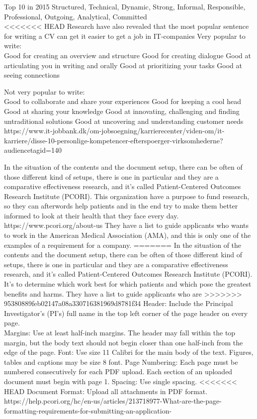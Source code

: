 Top 10 in 2015
Structured,
Technical,
Dynamic,
Strong,
Informal,
Responsible,
Professional,
Outgoing,
Analytical,
Committed \\

<<<<<<< HEAD
Research have also revealed that the most popular sentence for writing a CV can get it easier to get a job in IT-companies
Very popular to write:\\
Good for creating an overview and structure
Good for creating dialogue
Good at articulating you in writing and orally
Good at prioritizing your tasks
Good at seeing connections

Not very popular to write: \\
Good to collaborate and share your experiences
Good for keeping a cool head
Good at sharing your knowledge
Good at innovating, challenging and finding untraditional solutions
Good at uncovering and understanding customer needs
https://www.it-jobbank.dk/om-jobsoegning/karrierecenter/viden-om/it-karriere/disse-10-personlige-kompetencer-efterspoerger-virksomhederne?audiencetagid=140

In the situation of the contents and the document setup, there can be often of those different kind of setups, 
there is one in particular and they are a comparative effectiveness research, and it's called 
Patient-Centered Outcomes Research Institute (PCORI). 
This organization have a purpose to fund research, so they can afterwords help patients and in the end try to make them better
informed to look at their health that they face every day.
https://www.pcori.org/about-us
They have a list to guide applicants who wants to work in the American Medical Association (AMA),
and this is only one of the examples of a requirement for a company.
=======
In the situation of the contents and the document setup, there can be often of those different kind of setups,
there is one in particular and they are a comparative effectiveness research, and it's called
Patient-Centered Outcomes Research Institute (PCORI).
It's to determine which work best for which patients and which pose the greatest benefits and harms. %
They have a list to guide applicants who are
>>>>>>> 95380889feb02147a08a330716381969d8781f34
Header: Include the Principal Investigator’s (PI’s) full name in the top left corner of the page header on every page. \\
Margins: Use at least half-inch margins. The header may fall within the top margin, but the body text should not begin closer than one half-inch from the edge of the page.
Font: Use size 11 Calibri for the main body of the text. Figures, tables and captions may be size 8 font.
Page Numbering: Each page must be numbered consecutively for each PDF upload. Each section of an uploaded document must begin with page 1.
Spacing: Use single spacing.
<<<<<<< HEAD
Document Format: Upload all attachments in PDF format. \\
https://help.pcori.org/hc/en-us/articles/213718977-What-are-the-page-formatting-requirements-for-submitting-an-application-

